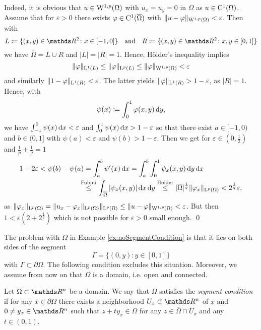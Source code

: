 \begin{ex}[Exercise]
  Indeed, it is obvious that $u \in \mathrm{W}^{1,p}(\Omega)$ with $u_x = u_y = 0$ in $\Omega$ as $u \in \mathrm{C}^1(\Omega)$.
  Assume that for $\varepsilon > 0$ there exists $\varphi \in \mathrm{C}^1(\overline\Omega)$ with $\| u - \varphi\|_{\mathrm{W}^{1,p}(\Omega)} < \varepsilon$.
  Then with
    $$
    L \coloneqq \{ (x,y) \in \R^2 \colon x \in [-1,0] \} \quad\text{and}\quad
    R \coloneqq \{ (x,y) \in \R^2 \colon x, y \in [0,1] \}
    $$
    we have $\overline\Omega = L \cup R$ and $|L| = |R| = 1$.
    Hence, Hölder's inequality implies
    $$
    \|\varphi\|_{\mathrm{L}^1(L)} 
    \leq \|\varphi\|_{\mathrm{L}^p(L)}
    \leq \|\varphi\|_{\mathrm{W}^{1,p}(\Omega)}
    < \varepsilon
    $$
    and similarly $\|1 - \varphi\|_{\mathrm{L}^1(R)} < \varepsilon$.
    The latter yields $\|\varphi\|_{\mathrm{L}^1(R)} > 1 - \varepsilon$, as $|R| = 1$.
    Hence, with
    $$
    \psi(x) \coloneqq \int_0^1 \varphi(x,y) \, {\operatorname{d}\!{y}},
    $$
    we have $\int_{-1}^0 \psi(x) \, {\operatorname{d}\!{x}} < \varepsilon$ and $\int_0^1 \psi(x) \, {\operatorname{d}\!{x}} > 1 - \varepsilon$ so that there exist $a \in [-1,0)$ and $b \in (0,1]$ with $\psi(a) < \varepsilon$ and $\psi(b) > 1 - \varepsilon$.
    Then we get for $\varepsilon \in (0,\frac{1}{2})$ and $\frac{1}{p} + \frac{1}{q} = 1$
    \begin{align*}
      1 - 2\varepsilon
      < \psi(b) - \psi(a)
      &= \int_a^b \psi'(x) \d x
      =\int_a^b \int_0^1 \psi_x(x,y) \d y \d x \\
      &\hspace{-0.7em}\overset{\text{Fubini}}{\leq} \int_{\,\overline\Omega} |\psi_x (x,y)| \d x \d y
      \overset{\text{Hölder}}{\leq} |\overline\Omega|^{\frac{1}{q}} \|\varphi_x\|_{\Ell^p(\Omega)}
      < 2^{\frac{1}{q}}\varepsilon,
    \end{align*}
    as $\|\varphi_x\|_{\mathrm{L}^p(\Omega)} = \| u_x - \varphi_x\|_{\mathrm{L}^p(\Omega)} \|_{\mathrm{L}^p(\Omega)} \leq \|u - \varphi\|_{\mathrm{W}^{1,p}(\Omega)} < \varepsilon$.
    But then $1 < \varepsilon(2 + 2^{\frac{1}{q}})$ which is not possible for $\varepsilon > 0$ small enough.  \qed
\end{ex}

The problem with $\Omega$ in Example \ref{ex:noSegmentCondition} is that it lies on both sides of the segment $$\Gamma = \{(0,y) \colon y \in [0,1]\}$$ with $\Gamma \subset \partial \Omega$.
The following condition excludes this situation.
Moreover, we assume from now on that $\Omega$ is a domain, i.e. open and connected.

\begin{defn}
  \label{defn:segmentCond}
  Let $\Omega \subset \R^n$ be a domain.
  We say that $\Omega$ satisfies the \emph{segment condition} if for any $x \in \partial\Omega$ there exists a neighborhood $U_x \subset \R^n$ of $x$ and $0 \neq y_x \in \R^n$ such that $z + t y_x \in \Omega$ for any $z \in \overline\Omega \cap U_x$ and any $t \in (0,1)$.
\end{defn}

